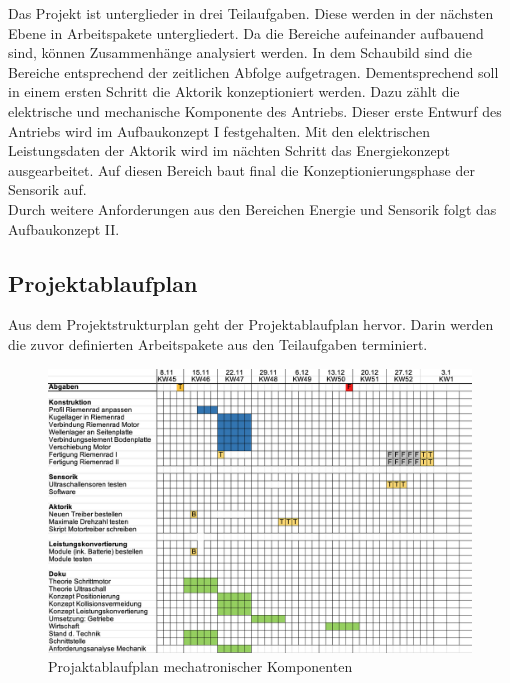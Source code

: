 Das Projekt ist unterglieder in drei Teilaufgaben. Diese werden in der nächsten Ebene in Arbeitspakete untergliedert. 
Da die Bereiche aufeinander aufbauend sind, können Zusammenhänge analysiert werden. In dem Schaubild sind die Bereiche entsprechend der zeitlichen Abfolge aufgetragen. Dementsprechend soll in einem ersten Schritt die Aktorik konzeptioniert werden. Dazu zählt die elektrische und mechanische Komponente des Antriebs. Dieser erste Entwurf des Antriebs wird im Aufbaukonzept I festgehalten. Mit den elektrischen Leistungsdaten der Aktorik wird im nächten Schritt das Energiekonzept ausgearbeitet. Auf diesen Bereich baut final die Konzeptionierungsphase der Sensorik auf. \\ 
Durch weitere Anforderungen aus den Bereichen Energie und Sensorik folgt das Aufbaukonzept II. 

\newpage
\subsection{Projektablaufplan}
\label{projektablaufplan}
Aus dem Projektstrukturplan geht der Projektablaufplan hervor. Darin werden die zuvor definierten Arbeitspakete aus den Teilaufgaben terminiert. 
\begin{figure}[h]
	\begin{center}
		\includegraphics[width=17cm]{roadmap.png}
		\caption{Projaktablaufplan mechatronischer Komponenten}
		\label{pic:roadmap}
	\end{center}
\end{figure}



